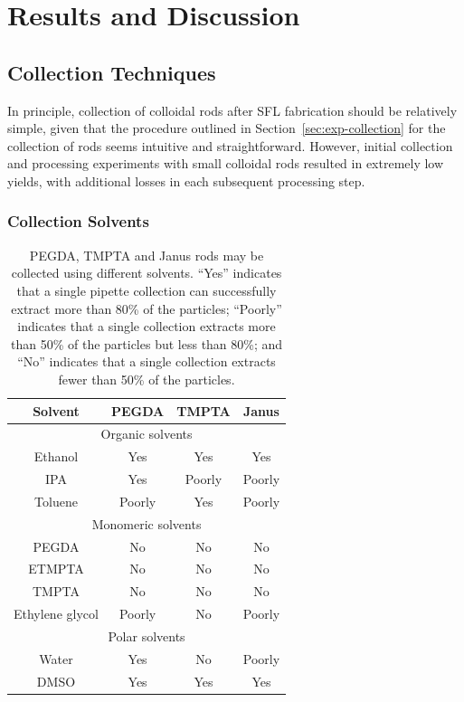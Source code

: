 \section{Results and Discussion}

\subsection{Collection Techniques}
\label{sec:rod-collection}

In principle, collection of colloidal rods after SFL fabrication should be relatively simple,
given that the 
procedure outlined in Section~\ref{sec:exp-collection} for the collection of rods seems intuitive and
straightforward.  However, initial 
collection and processing experiments 
with small colloidal rods resulted in
extremely low yields, with additional losses in each subsequent processing step.


\subsubsection{Collection Solvents}

\begin{table}[h]
\begin{center}
\begin{tabular}{| c | c | c | c |}
\hline 
Solvent & PEGDA & TMPTA & Janus \\ \hline
\multicolumn{4}{|c|}{Organic solvents} \\ \hline
Ethanol & Yes & Yes & Yes \\
IPA & Yes & Poorly & Poorly \\
Toluene & Poorly & Yes & Poorly \\
\hline
\multicolumn{4}{|c|}{Monomeric solvents} \\ \hline
PEGDA & No & No & No \\
ETMPTA & No & No & No \\
TMPTA & No & No & No \\
Ethylene glycol & Poorly & No & Poorly \\
\hline
\multicolumn{4}{|c|}{Polar solvents} \\ \hline
Water & Yes & No & Poorly \\
DMSO & Yes & Yes & Yes \\
\hline
\end{tabular}

\end{center}
\caption{PEGDA, TMPTA and Janus rods may be collected using different solvents. ``Yes'' indicates that
a single pipette collection can successfully extract more than 80\% of the particles;
``Poorly'' indicates that a single collection extracts more than 50\% of the particles
but less than 80\%; and
``No'' indicates that a single collection extracts fewer than 50\% of the particles.}
\label{tab:collect-solvent}
\end{table}

